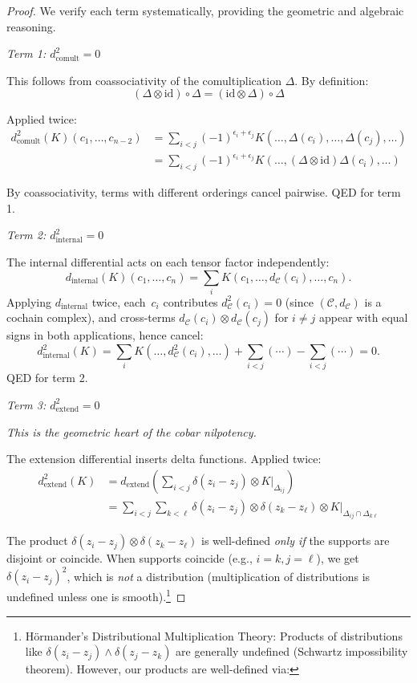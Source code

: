 \begin{proof}
We verify each term systematically, providing the geometric and algebraic reasoning.

\emph{Term 1: $d_{\text{comult}}^2 = 0$}

This follows from coassociativity of the comultiplication $\Delta$. By definition:
\[(\Delta \otimes \text{id}) \circ \Delta = (\text{id} \otimes \Delta) \circ \Delta\]

Applied twice:
\begin{align*}
d_{\text{comult}}^2(K)(c_1, \ldots, c_{n-2}) &= \sum_{i < j} (-1)^{\epsilon_i + 
\epsilon_j} K(\ldots, \Delta(c_i), \ldots, \Delta(c_j), \ldots) \\
&= \sum_{i < j} (-1)^{\epsilon_i + \epsilon_j} K(\ldots, (\Delta \otimes \text{id})
\Delta(c_i), \ldots)
\end{align*}

By coassociativity, terms with different orderings cancel pairwise. QED for term 1.

\emph{Term 2: $d_{\text{internal}}^2 = 0$}

The internal differential acts on each tensor factor independently:
\[
d_{\text{internal}}(K)(c_1, \ldots, c_n) = \sum_i K(c_1, \ldots, d_{\mathcal{C}}(c_i), \ldots, c_n).
\]
Applying $d_{\text{internal}}$ twice, each~$c_i$ contributes
$d_{\mathcal{C}}^2(c_i) = 0$ (since $(\mathcal{C}, d_{\mathcal{C}})$
is a cochain complex), and cross-terms
$d_{\mathcal{C}}(c_i) \otimes d_{\mathcal{C}}(c_j)$ for $i \neq j$
appear with equal signs in both applications, hence cancel:
\[d_{\text{internal}}^2(K) = \sum_i K(\ldots, d_{\mathcal{C}}^2(c_i), \ldots) + \sum_{i < j}(\cdots) - \sum_{i < j}(\cdots) = 0.\]
QED for term 2.

\emph{Term 3: $d_{\text{extend}}^2 = 0$}

\emph{This is the geometric heart of the cobar nilpotency.}

The extension differential inserts delta functions. Applied twice:
\begin{align*}
d_{\text{extend}}^2(K) &= d_{\text{extend}}\left(\sum_{i<j} \delta(z_i - z_j) \otimes 
K|_{\Delta_{ij}}\right) \\
&= \sum_{i<j} \sum_{k<\ell} \delta(z_i - z_j) \otimes \delta(z_k - z_\ell) \otimes 
K|_{\Delta_{ij} \cap \Delta_{k\ell}}
\end{align*}

The product $\delta(z_i - z_j) \otimes \delta(z_k - z_\ell)$
is well-defined \emph{only if} the supports are disjoint or coincide. When supports 
coincide (e.g., $i=k, j=\ell$), we get $\delta(z_i - z_j)^2$, which is \emph{not} 
a distribution (multiplication of distributions is undefined unless one is smooth).\footnote{%
Hörmander's Distributional Multiplication Theory: Products of distributions like 
$\delta(z_i - z_j) \wedge \delta(z_j - z_k)$ are generally undefined (Schwartz impossibility 
theorem). However, our products are well-defined via:

}
\end{proof}
